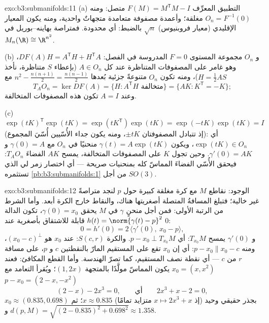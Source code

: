 \begin{solution}{exo:b3:submanifolds:11}
(a) التطبيق المعرِّف $F(M) = M^{\mathsf T}M - I$ متصل: ومنه $O_n = F^{-1}(0)$ مغلقة؛ وأعمدة
مصفوفة متعامدة متجهاتٌ واحدية، ومنه يكون المعيار الإقليدي
(معيار فروبنيوس) $\sqrt n$ بالضبط: أي محدودة. فمتراصة
بهاينه--بوريل في $M_n(\R) \cong \R^{n^2}$.

(b) و $O_n$ مجموعة المستوى $F = 0$ المدروسة في الفصل: $DF(A)H = A^{\mathsf T}H + H^{\mathsf T}A$،
وهو غامر على المصفوفات المتناظرة عند كل $A \in O_n$ (بإعطاء $S$
متناظرة، نأخذ $H = \frac12AS$)، ومنه تكون $O_n$ متنوعةً جزئية
بُعدها $n^2 - \frac{n(n+1)}2 = \frac{n(n-1)}2$ مع
\[
T_AO_n = \ker DF(A) = \{H : A^{\mathsf T}H \text{ متخالفة}\} = \{AK : K^{\mathsf T} = -K\} ;
\]
وعند $A = I$ تكون هذه المصفوفات المتخالفة.

(c) $\exp(tK)^{\mathsf T}\exp(tK) = \exp(tK^{\mathsf T})
\exp(tK) = \exp(-tK)\exp(tK) = I$ (إذ تتبادل المصفوفتان $\pm tK$، ومنه يكون جداء
الأُسّيين أُسّيَ المجموع): أي $\exp(tK) \in O_n$، ويكون $\gamma(t) =
A\exp(tK)$ منحنيًا في
$O_n$ مع $\gamma(0) = A$ و $\gamma'(0) = AK$. وحين تجول $K$ على المصفوفات
المتخالفة، يمسح $AK$ الفضاءَ $T_AO_n$: فيحقق الأُسّي الفضاءَ
المماسّ كله بمنحنيات صريحة --- أي اختصار زمر لي الذي تستثمره
\cref{pb:b3:submanifolds:1} من أجل $SO(3)$.
\end{solution}

\begin{solution}{exo:b3:submanifolds:12}
الوجود: نقاطع $M$ مع كرة مغلقة كبيرة حول $p$ لنجد متراصةً غير
خالية؛ فتبلغ المسافةُ المتصلة أصغريتها هناك، والنقاط خارج
الكرة أبعد. وأما الشرط من الرتبة الأولى: فمن أجل منحنٍ $\gamma$
في $M$ يحقق $\gamma(0) = x_0$، تكون الدالة $h(t) = \norm{\gamma(t)
- p}^2$ قابلة للاشتقاق بأصغرية
عند $0$:
\[
0 = h'(0) = 2\,\langle\gamma'(0),\ x_0 - p\rangle,
\]
و $\gamma'(0)$ يمسح $T_{x_0}M$: أي $p - x_0 \perp
T_{x_0}M$. والكرة $S(c, r)$:
 عند $x_0$ هو $(x_0 - c)^\perp$، ومنه $p - x_0 \parallel x_0 - c$: أي إن $x_0$
تقع على المستقيم المارّ بالنقطتين $c$ و $p$، على مسافة $r$ من $c$ ---
أي نقطة نصف المستقيم، كما تصرّ الهندسة. وأما القطع المكافئ:
فعند $x_0 = (x, x^2)$ يكون المماسّ مولَّدًا بالمتجهة $(1, 2x)$؛
ويُقرأ التعامد مع $p - x_0 = (2 - x, -x^2)$
\[
(2 - x) - 2x^3 = 0,
\qquad\text{أي}\qquad 2x^3 + x - 2 = 0,
\]
بجذر حقيقي وحيد (إذ $x \mapsto 2x^3 + x$ متزايد تمامًا) $x \approx 0.835$؛ ثم $x_0 \approx (0.835,
0.698)$
و $d(p, M) = \sqrt{(2 - 0.835)^2 + 0.698^2}
\approx 1.358$.
\end{solution}

